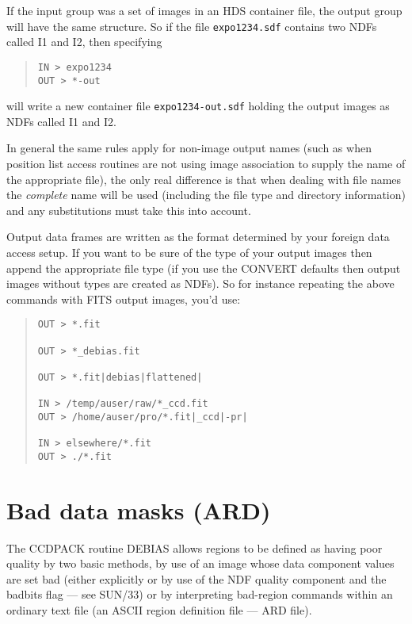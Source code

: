 \documentclass[twoside,11pt]{article}
\newcommand{\htmlref}[2]{#1}
\newcommand{\xref}[3]{#1}
\newcommand{\xlabel}[1]{}
\renewcommand{\_}{\texttt{\symbol{95}}}
\newenvironment{myquote}{\begin{quote}\begin{small}}{\end{small}\end{quote}}
\newcommand{\text}[1]{{\small \tt #1}}
\newcommand{\xroutine}[1]{\htmlref{{\sc #1}}{#1}}
\begin{document}
If the input group was a set of images in an HDS container file,
the output group will have the same structure.
So if the file \text{expo1234.sdf} 
contains two NDFs called I1 and I2, then specifying
\begin{myquote}
\begin{verbatim}
IN > expo1234
OUT > *-out
\end{verbatim}
\end{myquote}
will write a new container file \text{expo1234-out.sdf}
holding the output images as NDFs called I1 and I2.

In general the same rules apply for non-image output names (such as
when position list access routines are not using image association to
supply the name of the appropriate file), the only real difference is
that when dealing with file names the {\em complete} name will be used
(including the file type and directory information) and any
substitutions must take this into account.

Output data frames are written as the format determined by your
foreign data access setup. If you want to be sure of the type of your
output images then append the appropriate file type (if you use the
CONVERT defaults then output images without types are created as
NDFs). So for instance repeating the above commands with FITS output
images, you'd use:
\begin{myquote}
\begin{verbatim}
OUT > *.fit

OUT > *_debias.fit

OUT > *.fit|debias|flattened|

IN > /temp/auser/raw/*_ccd.fit
OUT > /home/auser/pro/*.fit|_ccd|-pr|

IN > elsewhere/*.fit
OUT > ./*.fit
\end{verbatim}
\end{myquote}

\section{Bad data masks (ARD) \label{datamasks} \xlabel{datamasks}}
The CCDPACK routine \xroutine{DEBIAS} allows regions to be defined as
having poor quality by two basic methods, by use of an image whose data
component values are set bad (either explicitly or by use of the
NDF quality component and the badbits flag --- see \xref{SUN/33}{sun33}{})
or by interpreting bad-region commands within an ordinary text file
(an ASCII region definition file --- \xref{ARD}{sun183}{} file).
\end{document}
